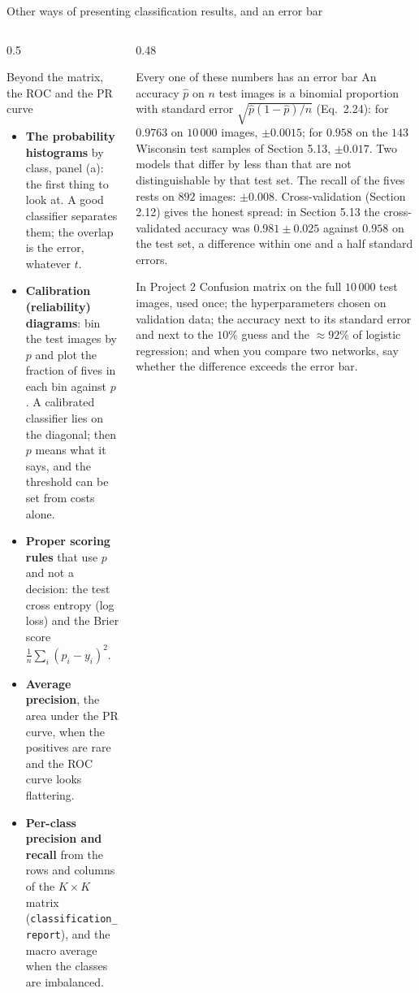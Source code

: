 \documentclass[10pt,aspectratio=169]{beamer}
\begin{document}
\begin{frame}{Other ways of presenting classification results, and an error bar}
\small
\begin{columns}[T]
\begin{column}{0.5\textwidth}
\begin{block}{Beyond the matrix, the ROC and the PR curve}
\scriptsize
\begin{itemize}
  \item \textbf{The probability histograms} by class, panel (a): the first
        thing to look at.  A good classifier separates them; the overlap is
        the error, whatever $t$.
  \item \textbf{Calibration (reliability) diagrams}: bin the test images by
        $p$ and plot the fraction of fives in each bin against $p$.  A
        calibrated classifier lies on the diagonal; then $p$ means what it
        says, and the threshold can be set from costs alone.
  \item \textbf{Proper scoring rules} that use $p$ and not a decision: the
        test cross entropy (log loss) and the Brier score
        $\frac{1}{n}\sum_i(p_i-y_i)^{2}$.
  \item \textbf{Average precision}, the area under the PR curve, when the
        positives are rare and the ROC curve looks flattering.
  \item \textbf{Per-class precision and recall} from the rows and columns
        of the $K\times K$ matrix (\texttt{classification\_report}), and
        the macro average when the classes are imbalanced.
\end{itemize}
\end{block}
\end{column}
\begin{column}{0.48\textwidth}
\begin{block}{Every one of these numbers has an error bar}
\scriptsize
An accuracy $\hat{p}$ on $n$ test images is a binomial proportion with
standard error $\sqrt{\hat{p}(1-\hat{p})/n}$ (Eq.~2.24): for
$0.9763$ on $10\,000$ images, $\pm0.0015$; for $0.958$ on the $143$
Wisconsin test samples of Section 5.13, $\pm0.017$.  Two models that differ
by less than that are not distinguishable by that test set.  The recall of
the fives rests on $892$ images: $\pm0.008$.  Cross-validation
(Section 2.12) gives the honest spread: in Section 5.13 the cross-validated
accuracy was $0.981\pm0.025$ against $0.958$ on the test set, a difference
within one and a half standard errors.
\end{block}
\begin{block}{In Project 2}
\scriptsize
Confusion matrix on the full $10\,000$ test images, used once; the
hyperparameters chosen on validation data; the accuracy next to its
standard error and next to the $10\%$ guess and the $\approx92\%$ of
logistic regression; and when you compare two networks, say whether the
difference exceeds the error bar.
\end{block}
\end{column}
\end{columns}
\end{frame}
\end{document}
